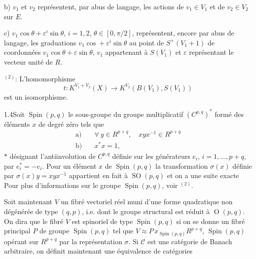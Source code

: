 b) $v_1$ et $v_2$ représentent, par abus de langage, les actions de $v_1\in V_1$ et de $v_2\in V_2$ sur $E$.

c) $v_1\cos\theta+\varepsilon^i\sin\theta$, $i=1,2$, $\theta\in[0,\pi/2]$, représentent, encore par abus de langage, les graduations $v_1\cos+\varepsilon^i\sin\theta$ au point de $S^+(V_1+1)$ de coordonnées $v_1\cos\theta+\varepsilon\sin\theta$, $v_1$ appartenant à $S(V_1)$ et $\varepsilon$ représentant le vecteur unité de $R$.

 $^{(2)}$: L'homomorphisme
\[
t:K^{V_1+V_2}(X)\longrightarrow K^{V_2}(B(V_1),S(V_1))
\]
est un isomorphisme.

1.4\quad Soit $\operatorname{Spin}(p,q)$ le sous-groupe du groupe multiplicatif $(C^{p,q})^*$ formé des éléments $x$ de degré zéro tels que
\[
\begin{aligned}
\text{a)}\quad&\forall\ y\in R^{p+q},\quad xyx^{-1}\in R^{p+q}\\
\text{b)}\quad&x^*x=1,
\end{aligned}
\]
$*$ désignant l'antiinvolution de $C^{p,q}$ définie sur les générateurs $e_i$, $i=1,\ldots,p+q$, par $e_i^*=-e_i$.
Pour un élément $x$ de $\operatorname{Spin}(p,q)$ la transformation $\sigma(x)$ définie par $\sigma(x)y=xyx^{-1}$ appartient en fait à $\operatorname{SO}(p,q)$ et on a une suite exacte
Pour plus d'informations sur le groupe $\operatorname{Spin}(p,q)$, voir $^{(2)}$.

Soit maintenant $V$ un fibré vectoriel réel muni d'une forme quadratique non dégénérée de type $(q,p)$, i.e. dont le groupe structural est réduit à $\operatorname{O}(p,q)$. On dira que le fibré $V$ est spinoriel de type $\operatorname{Spin}(p,q)$ si on se donne un fibré principal $P$ de groupe $\operatorname{Spin}(p,q)$ tel que $V\approx P\,x_{\operatorname{Spin}(p,q)}R^{p+q}$, $\operatorname{Spin}(p,q)$ opérant sur $R^{p+q}$ par la représentation $\sigma$. Si $\mathcal C$ est une catégorie de Banach arbitraire, on définit maintenant une équivalence de catégories
